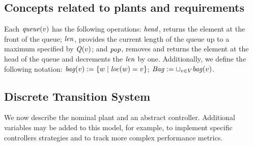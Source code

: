 \subsection{Concepts related to plants and requirements}
 

    
 
Each $\mathit{queue}(v)$ has the following operations: $\mathit{head}$, returns the element at the front of the queue; $\mathit{len}$, provides the current length of the queue up to a maximum specified by $\mathit{Q}(v)$; and $\mathit{pop}$, removes and returns the element at the head of the queue and decrements the $\mathit{len}$ by one. 
Additionally, we define the following notation: $\mathit{bag}(v) := \{ w \mid \mathit{loc}(w) = v\}$; $\mathit{Bag} := \cup_{v \in V } \mathit{bag}(v)$.

\subsection{Discrete Transition System}
\label{sec:dts_def}
We now describe the nominal  plant and an abstract controller. 
Additional variables may be added to this model, for example, to implement specific  controllers strategies and to track more complex performance metrics. 

